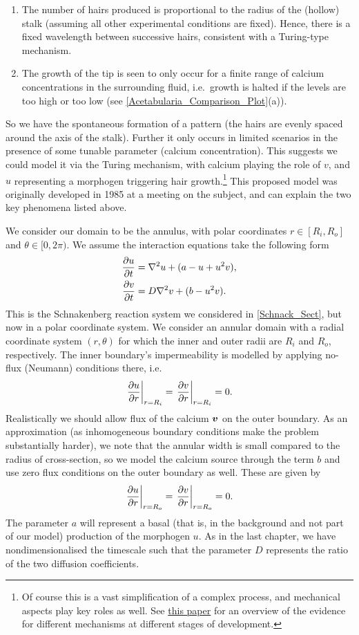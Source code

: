 \documentclass[main.tex]{subfiles}
\begin{document}
\begin{enumerate}
\item{The number of hairs produced  is proportional to the radius of the (hollow) stalk (assuming all other experimental conditions are fixed). Hence, there is a fixed wavelength between successive hairs, consistent with a Turing-type mechanism.}
\item{The growth of the tip is seen to only occur for a finite range of calcium concentrations in the surrounding fluid, i.e.\  growth is halted if the levels are too high or too low (see  \cref{Acetabularia_Comparison_Plot}(a)).}
\end{enumerate}
 So we have the spontaneous formation of a pattern (the hairs are evenly spaced around the axis of the stalk). Further it only occurs in limited scenarios in the presence of some tunable parameter (calcium concentration). This suggests we could model it via the Turing mechanism, with calcium playing the role of $v$, and $u$ representing a morphogen triggering hair growth.\footnote{Of course this is a vast simplification of a complex process, and mechanical aspects play key roles as well. See \href{https://doi.org/10.1098/rstb.2000.0565}{this paper} for an overview of the evidence for different mechanisms at different stages of development.} This proposed model was originally developed in 1985 at a meeting on the subject, and can explain the two key phenomena listed above. 
 
 We consider our domain to be the annulus, with polar coordinates $r \in [R_i, R_o]$ and $\theta \in [0, 2\pi)$. We assume the interaction equations take the following form
\begin{align}\label{Acetabularia_Model}
\pd{u}{t} &= \nabla^2 u+  (a-u+u^2v),\\
\nonumber\pd{v}{t} &=  D\nabla^2v+(b-u^2v).
\end{align}
This is the Schnakenberg reaction system we considered in \cref{Schnack_Sect}, but now in a polar coordinate system. We consider an annular domain with a radial coordinate system $(r,\theta)$ for which the inner and outer radii are $R_i$ and $R_o$, respectively. The inner boundary's impermeability is modelled by applying no-flux (Neumann) conditions there, i.e.\
\begin{equation}
\left.\pd{u}{r}\right|_{r= R_i} = \left.\pd{v}{r}\right|_{r= R_i} = 0. 
\end{equation}
Realistically we should allow flux of the calcium $\v{v}$ on the outer boundary. As an approximation (as inhomogeneous boundary conditions make the problem substantially harder), we note that the annular width is small compared to the radius of cross-section, so we model the calcium source through the term $b$ and use zero flux conditions on the outer boundary as well. These are given by
\begin{equation}
\left.\pd{u}{r}\right|_{r= R_o} = \left.\pd{v}{r}\right|_{r= R_o} = 0. 
\end{equation}
The parameter $a$ will represent a basal (that is, in the background and not part of our model) production of the morphogen $u$. As in the last chapter, we have nondimensionalised the timescale such that the parameter $D$ represents the ratio of the two diffusion coefficients.
\end{document}
